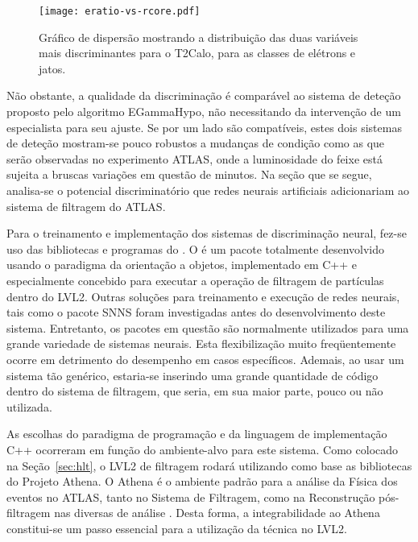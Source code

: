 \begin{figure}
\begin{center}
\texttt{[image: eratio-vs-rcore.pdf]}
\end{center}
\caption{Gráfico de dispersão mostrando a distribuição das duas variáveis mais
discriminantes para o T2Calo, para as classes de elétrons e jatos.}
\label{fig:eratio-vs-rcore}
\end{figure}

Não obstante, a qualidade da discriminação é comparável ao sistema de deteção
proposto pelo algoritmo EGammaHypo, não necessitando da intervenção de um
especialista para seu ajuste. Se por um lado são compatíveis, estes dois
sistemas de deteção mostram-se pouco robustos a mudanças de condição como as
que serão observadas no experimento ATLAS, onde a luminosidade do feixe está
sujeita a bruscas variações em questão de minutos. Na seção que se segue,
analisa-se o potencial discriminatório que redes neurais artificiais
adicionariam ao sistema de filtragem do ATLAS.

Para o treinamento e implementação dos sistemas de discriminação neural,
fez-se uso das bibliotecas e programas do . O
 é um pacote totalmente desenvolvido usando o paradigma da
orientação a objetos, implementado em C++ \cite{stroustrup, booch} e
especialmente concebido para executar a operação de filtragem de partículas
dentro do LVL2. Outras soluções para treinamento e execução de redes neurais,
tais como o pacote SNNS \cite{snns} foram investigadas antes do
desenvolvimento deste sistema. Entretanto, os pacotes em questão são
normalmente utilizados para uma grande variedade de sistemas neurais. Esta
flexibilização muito freqüentemente ocorre em detrimento do desempenho em
casos específicos. Ademais, ao usar um sistema tão genérico, estaria-se
inserindo uma grande quantidade de código dentro do sistema de filtragem, que
seria, em sua maior parte, pouco ou não utilizada.

As escolhas do paradigma de programação e da linguagem de implementação C++
ocorreram em função do ambiente-alvo para este sistema. Como colocado na
Seção~\ref{sec:hlt}, o LVL2 de filtragem rodará utilizando como base as
bibliotecas do Projeto Athena. O Athena é o ambiente padrão para a análise da
Física dos eventos no ATLAS, tanto no Sistema de Filtragem, como na
Reconstrução pós-filtragem nas diversas  de análise
. Desta forma, a integrabilidade ao Athena constitui-se um
passo essencial para a utilização da técnica no LVL2.

